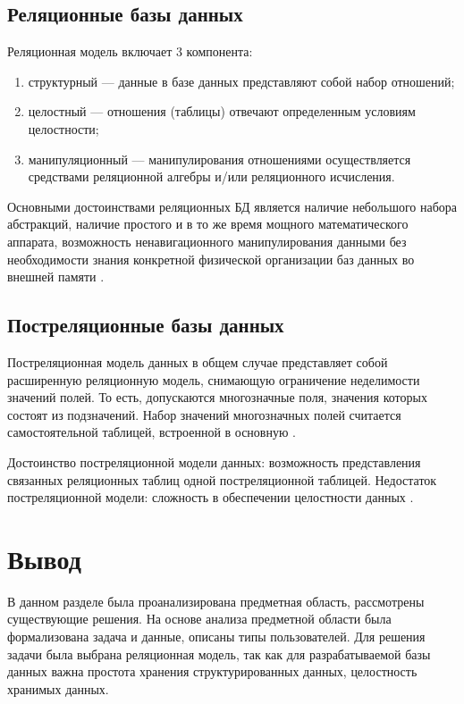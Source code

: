 \clearpage

\subsection{Реляционные базы данных}

Реляционная модель включает 3 компонента: 

\begin{enumerate}[label={\arabic*)}]
	\item структурный --- данные в базе данных представляют собой набор отношений;
	\item целостный --- отношения (таблицы) отвечают определенным условиям целостности;
	\item манипуляционный --- манипулирования отношениями осуществляется средствами реляционной алгебры и/или реляционного исчисления.
\end{enumerate}

Основными достоинствами реляционных БД является наличие небольшого набора абстракций, наличие простого и в то же время мощного математического аппарата, возможность ненавигационного манипулирования данными без необходимости знания конкретной физической организации баз данных во внешней памяти \cite{info_db_kuznecov}.

\subsection{Постреляционные базы данных}

Постреляционная модель данных в общем случае представляет собой расширенную реляционную модель, снимающую ограничение неделимости значений полей. То есть, допускаются многозначные поля, значения которых состоят из подзначений. Набор значений многозначных полей считается самостоятельной таблицей, встроенной в основную \cite{info_db_sopchenko}.

Достоинство постреляционной модели данных: возможность представления связанных реляционных таблиц одной постреляционной таблицей.  Недостаток постреляционной модели: сложность в обеспечении целостности данных \cite{info_db_sopchenko}.
        
\clearpage
                 
\section*{Вывод} 

В данном разделе была проанализирована предметная область, рассмотрены существующие решения. На основе анализа предметной области была формализована задача и данные, описаны типы пользователей. Для решения задачи была выбрана реляционная модель, так как для разрабатываемой базы данных важна простота хранения структурированных данных, целостность хранимых данных.